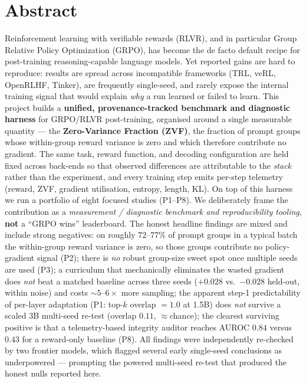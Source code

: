 \documentclass[12pt,a4paper]{report}
\begin{document}
\chapter*{Abstract}
Reinforcement learning with verifiable rewards (RLVR), and in particular Group
Relative Policy Optimization (GRPO), has become the de facto default recipe for
post-training reasoning-capable language models. Yet reported gains are hard to
reproduce: results are spread across incompatible frameworks (TRL, veRL,
OpenRLHF, Tinker), are frequently single-seed, and rarely expose the internal
training signal that would explain \emph{why} a run learned or failed to learn.
This project builds a \textbf{unified, provenance-tracked benchmark and diagnostic
harness} for GRPO/RLVR post-training, organised around a single measurable
quantity --- the \textbf{Zero-Variance Fraction (ZVF)}, the fraction of prompt
groups whose within-group reward variance is zero and which therefore contribute
no gradient. The same task, reward function, and decoding configuration are held
fixed across back-ends so that observed differences are attributable to the
\emph{stack} rather than the experiment, and every training step emits per-step
telemetry (reward, ZVF, gradient utilisation, entropy, length, KL). On top of this
harness we run a portfolio of eight focused studies (P1--P8). We deliberately frame
the contribution as a \emph{measurement / diagnostic benchmark and reproducibility
tooling}, \textbf{not} a ``GRPO wins'' leaderboard. The honest headline findings
are mixed and include strong negatives: on roughly $72$--$77\%$ of prompt groups in a
typical batch the within-group reward variance is zero, so those groups contribute no
policy-gradient signal (P2); there is \emph{no} robust group-size
sweet spot once multiple seeds are used (P3); a curriculum that mechanically
eliminates the wasted gradient does \emph{not} beat a matched baseline across three
seeds ($+0.028$ vs.\ $-0.028$ held-out, within noise) and costs ${\sim}5$--$6\times$
more sampling; the apparent step-1 predictability of per-layer adaptation
(P1: top-$k$ overlap $=1.0$ at 1.5B) does \emph{not} survive a scaled 3B
multi-seed re-test (overlap $0.11$, ${\approx}$chance); the clearest surviving
positive is that a telemetry-based integrity auditor reaches AUROC $0.84$ versus
$0.43$ for a reward-only baseline (P8). All findings were independently re-checked
by two frontier models, which flagged several early single-seed conclusions as
underpowered --- prompting the powered multi-seed re-test that produced the honest
nulls reported here.
\end{document}
